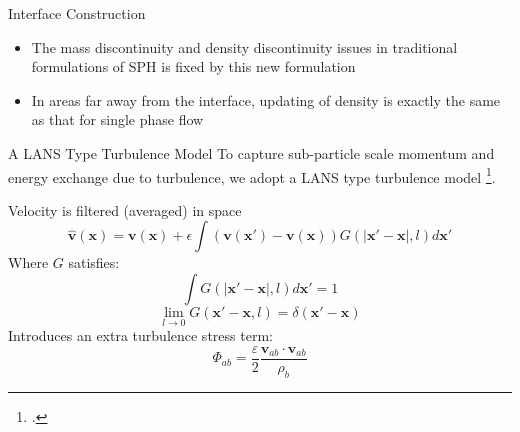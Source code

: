 \documentclass{beamer}
\begin{document}
\begin{frame}{Interface Construction}
\begin{minipage}{0.27 \textwidth}
\begin{figure}
\end{figure}
\end{minipage}

\begin{block}{}
  \begin{itemize}
    \item {The mass discontinuity and density discontinuity issues in traditional formulations of SPH is fixed by this new formulation
    } 
    \item {In areas far away from the interface, updating of density is exactly the same as that for single phase flow
    }
 \end{itemize}
\end{block}
\end{frame}

\begin{frame}{A LANS Type Turbulence Model}
To capture sub-particle scale momentum and energy exchange due to turbulence, we adopt a LANS type turbulence model \footcite{monaghan2011turbulence}.\\
\noindent
\begin{minipage}{0.65 \textwidth}
Velocity is filtered (averaged) in space
\begin{equation}
\widehat{\textbf{v}}\left(\textbf{x}\right)=\textbf{v}\left(\textbf{x}\right)+ \epsilon \int \left(\textbf{v}\left(\textbf{x} \prime\right)-\textbf{v}\left(\textbf{x}\right)\right)G\left(\vert \textbf{x} \prime - \textbf{x} \vert, l\right) d\textbf{x} \prime
\end{equation}
Where $G$ satisfies:
\begin{equation}
\int G\left(\vert \textbf{x} \prime - \textbf{x} \vert, l\right) d\textbf{x} \prime =1
\end{equation}
\begin{equation}
\lim _{l \rightarrow 0} G\left(\textbf{x} \prime-\textbf{x}, l\right) =  \delta \left(\textbf{x} \prime - \textbf{x}\right)
\label{eq:SPH_kernel_delta}
\end{equation}
Introduces an extra turbulence stress term:
\begin{equation}
\Phi_{ab}=\dfrac{\varepsilon}{2} \dfrac{\textbf{v}_{ab} \cdot \textbf{v}_{ab}}{\rho_b} \label{eq:_LANS_trub_stress}
\end{equation}
\end{minipage}
%
\begin{minipage}{0.34 \textwidth}
\begin{figure}

\end{figure}
\end{minipage}
\end{frame}
\end{document}
